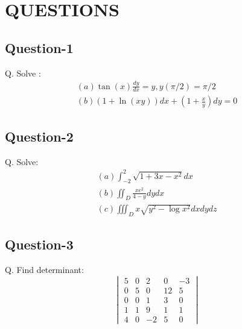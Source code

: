 \documentclass{article}
\begin{document}
\section{QUESTIONS}	
\subsection{Question-1}
Q. Solve :
\begin{align}
	(a) \tan(x) \frac{dy}{dx} = y , y(\pi / 2) = \pi/2\\
	(b) (1+\ln(xy))dx + (1+\frac{x}{y})dy=0
\end{align}

\subsection{Question-2}
Q. Solve:
\begin{align*}
	(a) \int_{-2}^{2} \sqrt{1+3x-x^2} dx\\
	(b) \iint_{D} \frac{xe^2}{4-y} dy dx\\
	(c) \iiint_{D} x \sqrt{y^2 - \log{x^2}} dx dy dz
\end{align*}

\subsection{Question-3}
Q. Find determinant:
\[
\begin{vmatrix}5 & 0 & 2 & 0 & -3 \\
	0 & 5 & 0 & 12 & 5 \\
	0 & 0 & 1 & 3 & 0 \\
	1 & 1 & 9 & 1 & 1 \\
	4 & 0 & -2 & 5 & 0 
\end{vmatrix}
\]
\end{document}
